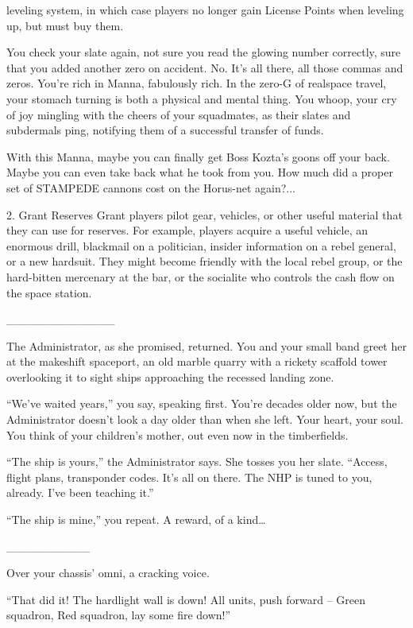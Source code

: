 leveling system, in which case players no longer gain License Points when leveling up, but must
buy them.


You check your slate again, not sure you read the glowing number correctly, sure that you added
another zero on accident. No. It’s all there, all those commas and zeros. You’re rich in Manna,
fabulously rich. In the zero-G of realspace travel, your stomach turning is both a physical and
mental thing. You whoop, your cry of joy mingling with the cheers of your squadmates, as their
slates and subdermals ping, notifying them of a successful transfer of funds.

With this Manna, maybe you can finally get Boss Kozta’s goons off your back. Maybe you can
even take back what he took from you. How much did a proper set of STAMPEDE cannons cost
on the Horus-net again?...

2. Grant Reserves
Grant players pilot gear, vehicles, or other useful material that they can use for reserves. For
example, players acquire a useful vehicle, an enormous drill, blackmail on a politician, insider
information on a rebel general, or a new hardsuit. They might become friendly with the local rebel
group, or the hard-bitten mercenary at the bar, or the socialite who controls the cash flow on the
space station.


\_\_\_\_\_\_\_\_\_\_\_\_\_


The Administrator, as she promised, returned. You and your small band greet her at the makeshift
spaceport, an old marble quarry with a rickety scaffold tower overlooking it to sight ships
approaching the recessed landing zone.

“We’ve waited years,” you say, speaking first. You’re decades older now, but the Administrator
doesn’t look a day older than when she left. Your heart, your soul. You think of your children’s
mother, out even now in the timberfields.

“The ship is yours,” the Administrator says. She tosses you her slate. “Access, flight plans,
transponder codes. It’s all on there. The NHP is tuned to you, already. I’ve been teaching it.”

“The ship is mine,” you repeat. A reward, of a kind…

\_\_\_\_\_\_\_\_\_\_


Over your chassis’ omni, a cracking voice.

“That did it! The hardlight wall is down! All units, push forward -- Green squadron, Red squadron,
lay some fire down!”




